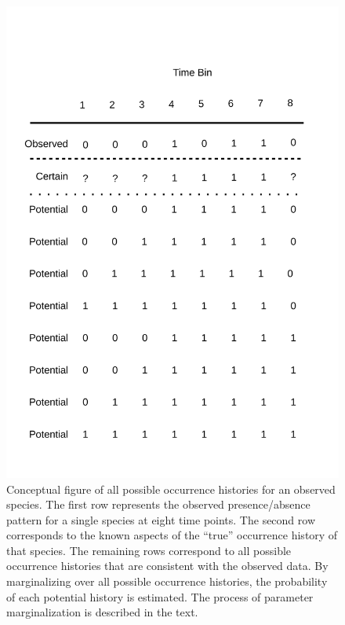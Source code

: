 \begin{figure}[ht]
  \centering
  \includegraphics[height=0.4\textheight, width=\textwidth, keepaspectratio=true]{chapter_coping/figure/margin}
  \caption[Conceptual figure of all possible occurrence histories for an observed species]{Conceptual figure of all possible occurrence histories for an observed species. The first row represents the observed presence/absence pattern for a single species at eight time points. The second row corresponds to the known aspects of the ``true'' occurrence history of that species. The remaining rows correspond to all possible occurrence histories that are consistent with the observed data. By marginalizing over all possible occurrence histories, the probability of each potential history is estimated. The process of parameter marginalization is described in the text.}
  \label{fig:margin_concept}
\end{figure}


